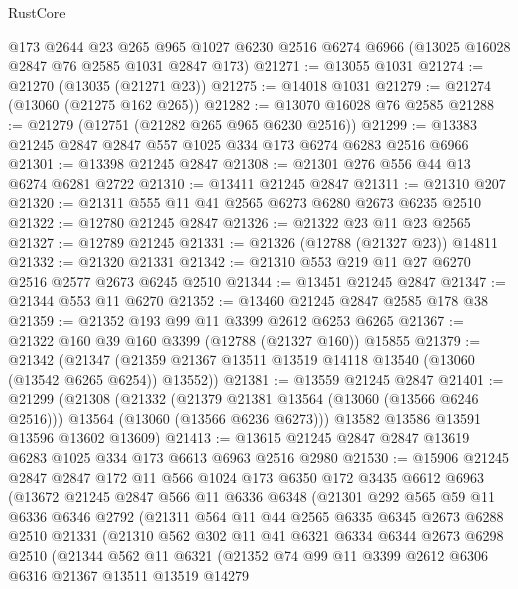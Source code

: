 \begin{lexlean}{RustCore}
\begin{coremodule}
    @173
    @2644
    @23
    @265
    @965
    @1027
    @6230
    @2516
    @6274
    @6966
    (@13025 @16028 @2847 @76 @2585 @1031 @2847 @173)
@21271 := @13055 @1031
@21274 := @21270 (@13035 (@21271 @23))
@21275 := @14018 @1031
@21279 := @21274 (@13060 (@21275 @162 @265))
@21282 := @13070 @16028 @76 @2585
@21288 := @21279 (@12751 (@21282 @265 @965 @6230 @2516))
@21299 := @13383 @21245 @2847 @2847 @557 @1025 @334 @173 @6274 @6283 @2516 @6966
@21301 := @13398 @21245 @2847
@21308 := @21301 @276 @556 @44 @13 @6274 @6281 @2722
@21310 := @13411 @21245 @2847
@21311 := @21310 @207
@21320 := @21311 @555 @11 @41 @2565 @6273 @6280 @2673 @6235 @2510
@21322 := @12780 @21245 @2847
@21326 := @21322 @23 @11 @23 @2565
@21327 := @12789 @21245
@21331 := @21326 (@12788 (@21327 @23)) @14811
@21332 := @21320 @21331
@21342 := @21310 @553 @219 @11 @27 @6270 @2516 @2577 @2673 @6245 @2510
@21344 := @13451 @21245 @2847
@21347 := @21344 @553 @11 @6270
@21352 := @13460 @21245 @2847 @2585 @178 @38
@21359 := @21352 @193 @99 @11 @3399 @2612 @6253 @6265
@21367 := @21322 @160 @39 @160 @3399 (@12788 (@21327 @160)) @15855
@21379 := @21342
    (@21347 (@21359 @21367 @13511 @13519 @14118 @13540 (@13060 (@13542 @6265 @6254)) @13552))
@21381 := @13559 @21245 @2847
@21401 := @21299
    (@21308
      (@21332
        (@21379 @21381 @13564 (@13060 (@13566 @6246 @2516)))
        @13564
        (@13060 (@13566 @6236 @6273)))
      @13582
      @13586
      @13591
      @13596
      @13602
      @13609)
@21413 := @13615 @21245 @2847 @2847 @13619 @6283 @1025 @334 @173 @6613 @6963 @2516 @2980
@21530 := @15906
    @21245
    @2847
    @2847
    @172
    @11
    @566
    @1024
    @173
    @6350
    @172
    @3435
    @6612
    @6963
    (@13672
      @21245
      @2847
      @566
      @11
      @6336
      @6348
      (@21301
        @292
        @565
        @59
        @11
        @6336
        @6346
        @2792
        (@21311
          @564
          @11
          @44
          @2565
          @6335
          @6345
          @2673
          @6288
          @2510
          @21331
          (@21310
            @562
            @302
            @11
            @41
            @6321
            @6334
            @6344
            @2673
            @6298
            @2510
            (@21344
              @562
              @11
              @6321
              (@21352
                @74
                @99
                @11
                @3399
                @2612
                @6306
                @6316
                @21367
                @13511
                @13519
                @14279

\end{coremodule}
\end{lexlean}
